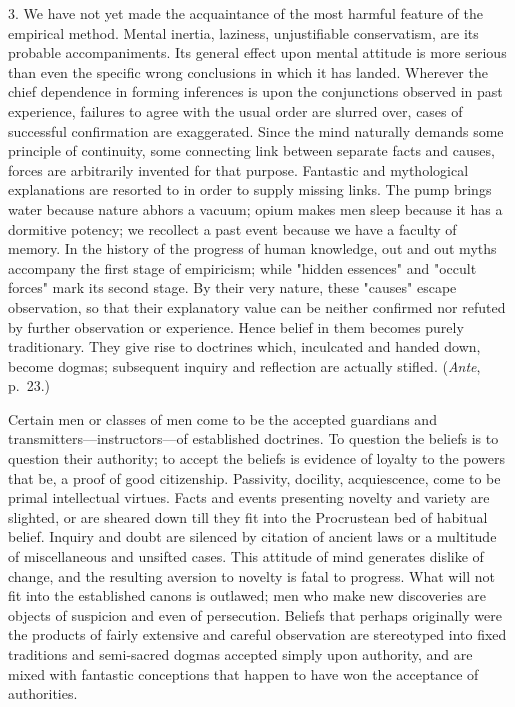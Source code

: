 \documentclass[letterpaper]{book}
\begin{document}

3. We have not yet made the acquaintance of the most harmful feature of
the empirical method. Mental inertia, laziness, unjustifiable
conservatism, are its probable accompaniments. Its general effect upon
mental attitude is more serious than even the specific wrong conclusions
in which it has landed. Wherever the chief dependence in forming
inferences is upon the conjunctions observed in past experience,
failures to agree with the usual order are slurred over, cases of
successful confirmation are exaggerated. Since the mind naturally
demands some principle of continuity, some connecting link between
separate facts and causes, forces are arbitrarily invented for that
purpose. Fantastic and mythological explanations are resorted to in
order to supply missing links. The pump brings water because nature
abhors a vacuum; opium makes men sleep because it has a
dormitive
potency; we recollect a past event because we have a faculty of memory.
In the history of the progress of human knowledge, out and out myths
accompany the first stage of empiricism; while "hidden essences" and
"occult forces" mark its second stage. By their very nature, these
"causes" escape observation, so that their explanatory value can be
neither confirmed nor refuted by further observation or experience.
Hence belief in them becomes purely traditionary. They give rise to
doctrines which, inculcated and handed down, become dogmas; subsequent
inquiry and reflection are actually stifled. (\emph{Ante}, p.\ 23.)


Certain men or classes of men come to be the accepted guardians and
transmitters---instructors---of established doctrines. To question the
beliefs is to question their authority; to accept the beliefs is
evidence of loyalty to the powers that be, a proof of good citizenship.
Passivity, docility, acquiescence, come to be primal intellectual
virtues. Facts and events presenting novelty and variety are slighted,
or are sheared down till they fit into the Procrustean bed of habitual
belief. Inquiry and doubt are silenced by citation of ancient laws or a
multitude of miscellaneous and unsifted cases. This attitude of mind
generates dislike of change, and the resulting aversion to novelty is
fatal to progress. What will not fit into the established canons is
outlawed; men who make new discoveries are objects of suspicion and even
of persecution. Beliefs that perhaps originally were the products of
fairly extensive and careful observation are stereotyped into fixed
traditions and semi-sacred dogmas accepted simply upon authority, and
are mixed with fantastic conceptions that happen to have won the
acceptance of
authorities.
\end{document}
